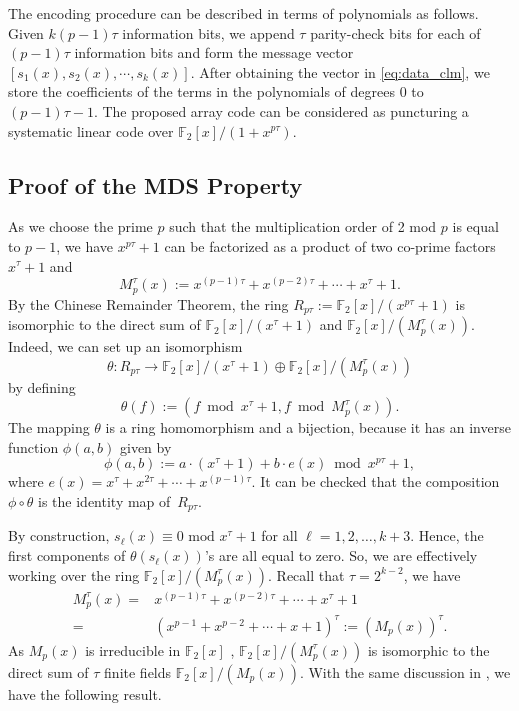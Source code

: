 \documentclass[conference]{IEEEtran}
\begin{document}
The encoding procedure can be described in terms of polynomials as follows. Given $k(p-1)\tau$ information bits, we append $\tau$ parity-check bits for each of $(p-1)\tau$ information bits and form the message vector $[s_1(x),s_2(x),\cdots,s_{k}(x)]$.
After obtaining the vector in \eqref{eq:data_clm},
 we store the coefficients of the terms in the polynomials of degrees 0 to $(p-1)\tau-1$.
The proposed array code can be considered as puncturing a systematic linear code over $\mathbb{F}_2[x]/(1+x^{p\tau})$.



\subsection{Proof of the MDS Property}
\label{sec:mds}
As we choose the prime $p$ such that the multiplication order of 2 mod $p$ is equal to $p-1$, we have $x^{p\tau}+1$ can be factorized as a product of two co-prime factors $x^{\tau}+1$ and
\[
M_p^{\tau}(x):=x^{(p-1)\tau}+x^{(p-2)\tau}+\cdots+x^{\tau}+1.
\]
By the Chinese Remainder Theorem, the ring $R_{p\tau}:=\mathbb{F}_{2}[x]/(x^{p\tau}+1)$ is isomorphic to the direct sum of $\mathbb{F}_2[x]/(x^{\tau}+1)$ and $\mathbb{F}_2[x]/(M_p^{\tau}(x))$. Indeed, we can set up an isomorphism
$$\theta: R_{p\tau} \rightarrow \mathbb{F}_2[x]/(x^{\tau}+1) \oplus \mathbb{F}_2[x]/(M_p^{\tau}(x))$$
by defining
\[
 \theta(f) := (f \bmod x^{\tau}+1, f \bmod M_p^{\tau}(x)).
\]
The mapping $\theta$ is a ring homomorphism and a bijection, because it has an inverse function $\phi(a,b)$  given by
\[
\phi(a,b) := a \cdot (x^{\tau}+1) + b \cdot e(x) \bmod x^{p\tau}+1,
\]
where $e(x) = x^{\tau} + x^{2\tau} + \cdots + x^{(p-1)\tau}$.
It can be checked that the composition $\phi \circ \theta$ is the identity map of~$R_{p\tau}$.

By construction, $s_\ell(x)\equiv0\mbox{ mod }x^{\tau}+1$ for all $\ell=1,2,\ldots,k+3$. Hence, the first components of $\theta(s_\ell(x))$'s are all equal to zero. So, we are effectively working over the ring $\mathbb{F}_{2}[x]/(M_p^{\tau}(x))$. Recall that $\tau=2^{k-2}$, we have
\begin{align*}
M_p^{\tau}(x)=&x^{(p-1)\tau}+x^{(p-2)\tau}+\cdots+x^{\tau}+1 \\
=&(x^{p-1}+x^{p-2}+\cdots+x+1)^{\tau}:= (M_p(x))^{\tau}.
\end{align*}
As $M_p(x)$ is irreducible in $\mathbb{F}_2[x]$ \cite{Hou2016BASIC}, $\mathbb{F}_{2}[x]/(M_p^{\tau}(x))$ is isomorphic to the direct sum of $\tau$ finite fields $\mathbb{F}_2[x]/(M_p(x))$. With the same discussion in \cite{Hou2016BASIC}, we have the following result.
\end{document}
